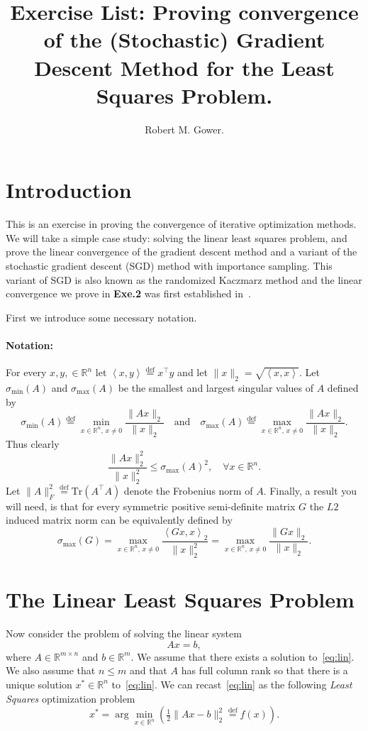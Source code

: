 \documentclass[11pt]{article}
\title{Exercise List: Proving convergence of the (Stochastic) Gradient Descent Method for the Least Squares Problem.}
\author{Robert M. Gower.}
\newcommand{\R}{\mathbb{R}}
\newcommand{\eqdef}{\overset{\text{def}}{=}}
\newcommand{\norm}[1]{\lVert#1\rVert}
\newcommand{\dotprod}[1]{\left< #1\right>}
\newcommand{\Tr}[1]{\mbox{Tr}\left( #1\right)}
\begin{document}
\maketitle
\section{Introduction}
This is an exercise in proving the convergence of iterative optimization methods. We will take a simple case study: solving the linear least squares problem, and prove the linear convergence of the gradient descent method and a variant of the  stochastic gradient descent (SGD) method with importance sampling. This variant of SGD is also known as the randomized Kaczmarz method and the linear convergence we prove in {\bf Exe.2}  was first established in~\cite{Strohmer2009}.


First we introduce some necessary notation.
\paragraph{Notation:} For every $x, y, \in \R^n$ let $\dotprod{x,y} \eqdef x^\top y$ and let $\norm{x}_2 = \sqrt{\dotprod{x,x}}.$ 
Let $\sigma_{\min}(A)$ and $\sigma_{\max}(A)$ be the smallest and largest singular values of $A$ defined by
\begin{equation} \label{eq:sigvals}
\sigma_{\min}(A) \eqdef \min_{x \in \R^n,\, x \neq 0} \frac{\norm{Ax}_2}{\norm{x}_2} \quad \mbox{and} \quad \sigma_{\max}(A) \eqdef \max_{x \in \R^n, \,x \neq 0} \frac{\norm{Ax}_2}{\norm{x}_2} .
\end{equation}
Thus clearly
\begin{equation}\label{eq:induced}
\frac{\norm{Ax}_2^2}{\norm{x}_2^2} \leq \sigma_{\max}(A)^2, \quad \forall x \in \R^n.
\end{equation}
Let $\norm{A}_F^2 \eqdef \Tr{A^\top A}$ denote the Frobenius norm of $A.$ Finally, a result you will need, is that for every symmetric positive semi-definite matrix $G$ the $L2$ induced matrix norm can be equivalently defined by
\begin{equation} \label{eq:inducedG}
\sigma_{\max}(G) = \max_{x \in \R^n,\, x \neq 0} \frac{\dotprod{Gx,x}_2}{\norm{x}_2^2} = \max_{x \in \R^n, \,x \neq 0} \frac{\norm{Gx}_2}{\norm{x}_2}.
\end{equation}
  
  \section{The Linear Least Squares Problem}
Now consider the problem of solving the linear system
\begin{equation} \label{eq:lin}
Ax =b,
\end{equation}
where $A \in \R^{m \times n}$ and $b \in \R^m.$  We assume that there exists a solution to~\eqref{eq:lin}. We also assume that $n \leq m$ and that $A$ has full column rank so that there is a unique solution $x^*\in \R^n$ to~\eqref{eq:lin}.
We can recast~\eqref{eq:lin} as the following \emph{Least Squares} optimization problem
\begin{equation} \label{eq:prob}
 x^* = \arg\min_{x \in \R^n} \left(\tfrac{1}{2}\norm{Ax -b}_2^2 \eqdef f(x)\right).
\end{equation}
\end{document}
